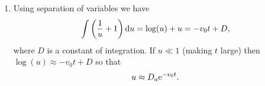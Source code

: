 \documentclass[a4paper, 12pt]{article}
\begin{document}
\begin{enumerate}[label={\bf \arabic{*}.\;}, ref={\arabic{*}},itemsep=3ex, left=0ex]
{\begin{enumerate}[label=(\alph*)]
{            For $\fd{v}{t}$ there is an intra-species decay term, $-rav^2$. So the population $v$ can only grow through interaction with $u$. This happens through a term
            \begin{equation}
              r\frac{uv}{1+u},
            \end{equation}
            which is the same (up to the constant $r$) as the inter-species interaction term of $u$, except it has a positive sign so tends to increase $v$.
          }
        \item{
            Using separation of variables we have
            \begin{equation}
              \int\left(\frac{1}{u} +1\right){\mathrm d}{u} = \log(u) + u= -v_0t +D,
            \end{equation}
            where $D$ is a constant of integration. If $u\ll 1$ (making $t$ large) then $\log(u) \approx -v_0t +D$ so that
            \begin{equation}
              u \approx D_a\mathrm{e} ^{-v_0 t}.
            \end{equation}
          }
      \end{enumerate}

    }



\end{enumerate}
\end{document}
